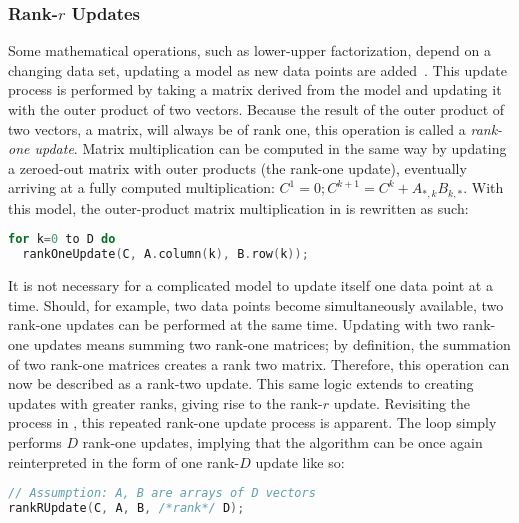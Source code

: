 \documentclass[\main/thesis.tex]{subfiles}
\begin{document}
\subsubsection{Rank-\texorpdfstring{$r$}{r} Updates}
Some mathematical operations, such as lower-upper factorization, depend on a changing data set, updating a model as new data points are added~\autocite{strange2007efficient}.
This update process is performed by taking a matrix derived from the model and updating it with the outer product of two vectors.
Because the result of the outer product of two vectors, a matrix, will always be of rank one, this operation is called a \emph{rank-one update}.\footnotemark
{}
Matrix multiplication can be computed in the same way by updating a zeroed-out matrix with outer products (the rank-one update), eventually arriving at a fully computed multiplication: $C^1=0; C^{k+1}=C^k+A_{*,k}B_{k,*}$.
With this model, the outer-product matrix multiplication in  is rewritten as such:
\begin{lstlisting}[caption={[Matrix Multiplication via Rank-One Update]Matrix multiplication using rank-one update.},label=lst:rankOne,language=C++,columns=flexible,morekeywords=uint64_t]
for k=0 to D do
  rankOneUpdate(C, A.column(k), B.row(k));
\end{lstlisting}

It is not necessary for a complicated model to update itself one data point at a time.
Should, for example, two data points become simultaneously available, two rank-one updates can be performed at the same time.
Updating with two rank-one updates means summing two rank-one matrices; by definition, the summation of two rank-one matrices creates a rank two matrix.\footnotemark
{}
Therefore, this operation can now be described as a rank-two update.
This same logic extends to creating updates with greater ranks, giving rise to the rank-$r$ update.\footnotemark
{}
Revisiting the process in , this repeated rank-one update process is apparent.
The loop simply performs $D$ rank-one updates, implying that the algorithm can be once again reinterpreted in the form of one rank-$D$ update like so:
\begin{lstlisting}[caption={[Matrix Multiplication via Rank-\texorpdfstring{$r$}{r} Update]Matrix multiplication using rank-$r$ update.},label=lst:rankR,language=C++,columns=flexible,morekeywords=uint64_t]
// Assumption: A, B are arrays of D vectors
rankRUpdate(C, A, B, /*rank*/ D);
\end{lstlisting}
\end{document}
